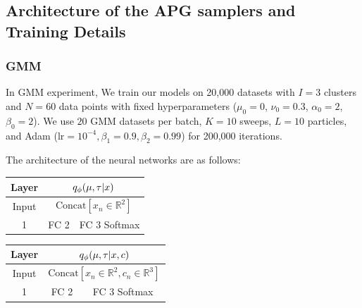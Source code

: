 \documentclass[anonymous=false, %
               format=acmsmall, %
               review=true, %
               screen=true, %
               nonacm=true]{acmart}
\theoremstyle{definition}
\begin{document}

\newpage
\subsection{Architecture of the APG samplers and Training Details}
\subsubsection*{GMM}
\label{appendix:arch-gmm}

In GMM experiment, We train our models on 20,000 datasets with $I = 3$ clusters and $N = 60$ data points with fixed hyperparameters ($\mu_0 = 0$, $\nu_0 = 0.3$, $\alpha_0 = 2$, $\beta_0 = 2$). We use $20$ GMM datasets per batch, $K=10$ sweeps, $L=10$ particles, and Adam ($\mathrm{lr} = 10^{-4}, \beta_1 = 0.9, \beta_2 = 0.99$) for 200,000 iterations.

The architecture of the neural networks are as follows:
\begin{table}[h]
    \centering
    \begin{tabular}{c|c|c}
    \toprule
     Layer 
     & 
    \multicolumn{2}{c}{$q_\phi(\mu, \tau | x)$}
    \\
    \midrule
    Input
    & 
    \multicolumn{2}{c}{$\mathrm{Concat}[x_n\in\mathbb{R}^2]$}
    \\
    \hline
    1
    & \parbox{3cm}{\centering FC 2}
    & \parbox{3cm}{\centering FC 3 Softmax}
    \\
    \bottomrule
    \end{tabular}
    \label{arch-gmm-rws}
\end{table}

\begin{table}[h]
    \centering
    \begin{tabular}{c|c|c}
    \toprule
     Layer 
     & 
    \multicolumn{2}{c}{$q_\phi(\mu, \tau | x, c)$}
    \\
    \midrule
    Input
    & 
    \multicolumn{2}{c}{$\mathrm{Concat}[x_n\in\mathbb{R}^2, c_n\in\mathbb{R}^3]$}
    \\
    \hline
    1
    & \parbox{3cm}{\centering FC 2}
    & \parbox{3cm}{\centering FC 3 Softmax}
    \\
    \bottomrule
    \end{tabular}
    \label{arch-gmm-global}
\end{table}
\end{document}
